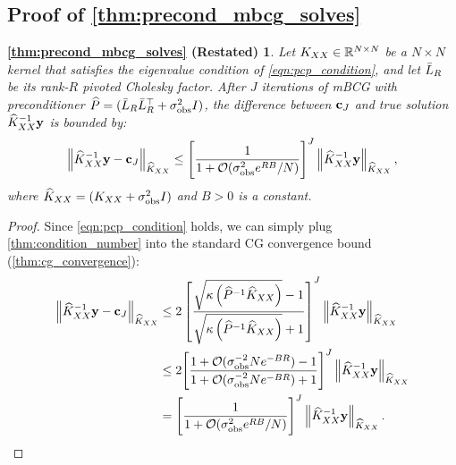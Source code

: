 \subsection{Proof of \cref{thm:precond_mbcg_solves}}
\newtheorem*{thm:precond_mbcg_solves}{\cref{thm:precond_mbcg_solves} (Restated)}
\begin{thm:precond_mbcg_solves}
  Let $K_{XX} \in \mathbb{R}^{N \times N}$ be a $N \times N$ kernel that satisfies the eigenvalue condition of \cref{eqn:pcp_condition},
	and let $\bar{L}_R$ be its rank-$R$ pivoted Cholesky factor.
	After $J$ iterations of mBCG with preconditioner $\widehat{P} = (\bar{L}_R \bar{L}_R^\top + \sigma_\text{obs}^2 I)$,
	the difference between $\mathbf{c}_J$ and true solution $\widehat{K}_{XX}^{-1} \mathbf{y}$ is bounded by:
  \begin{equation*}
    \left \Vert \trainK^{-1} \by - \bc_{J} \right \Vert_{\trainK}
    \leq \Bigg[ \frac 1 {1 + \bigo{\sigma^{2}_\text{obs} e^{RB}/N}} \Bigg]^{J}
    \left \Vert \trainK^{-1} \by \right \Vert_{\trainK},
		\nonumber
  \end{equation*}
	where $\widehat{K}_{XX} = (K_{XX} + \sigma^2_\text{obs} I)$ and $B > 0$ is a constant.
\end{thm:precond_mbcg_solves}

\begin{proof}
Since \cref{eqn:pcp_condition} holds, we can simply plug \cref{thm:condition_number} into the standard CG convergence bound (\cref{thm:cg_convergence}):
%
\begin{align*}
  \left \Vert \trainK^{-1} \by - \bc_{J} \right \Vert_{\trainK}
  &\leq
  2 \left[ \frac{ \sqrt{ \kappa\left( \trainP^{-1} \trainK \right)}  - 1 }{\sqrt{ \kappa \left( \trainP^{-1} \trainK \right)} + 1} \right]^J
  \left \Vert \trainK^{-1} \by \right \Vert_{\trainK}
  \\
  &\leq
  2 \Bigg[ \frac{ 1 + \bigo{ \sigma^{-2}_\text{obs} N e^{-BR} } - 1 }{ 1 + \bigo{ \sigma^{-2}_\text{obs} N e^{-BR} } + 1} \Bigg]^J
  \left \Vert \trainK^{-1} \by \right \Vert_{\trainK}
  \\
  &=
  \Bigg[ \frac 1 {1 + \bigo{\sigma^{2}_\text{obs} e^{RB}/N}} \Bigg]^{J}
  \left \Vert \trainK^{-1} \by \right \Vert_{\trainK}.
\end{align*}
\end{proof}




